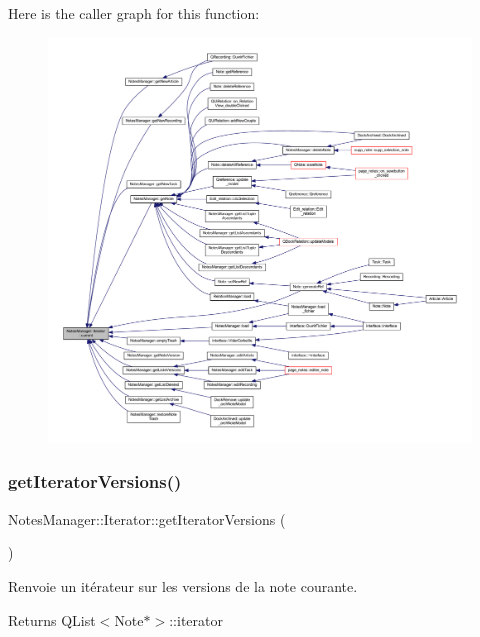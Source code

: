 Here is the caller graph for this function\+:\nopagebreak
\begin{figure}[H]
\begin{center}
\leavevmode
\includegraphics[width=350pt]{class_notes_manager_1_1_iterator_a4fd73444f2edd5f196d7b950527f5a90_icgraph}
\end{center}
\end{figure}
\mbox{\label{class_notes_manager_1_1_iterator_a09a650ca2eeca614a4129ed5e1795e96}} 
\subsubsection{\texorpdfstring{get\+Iterator\+Versions()}{getIteratorVersions()}}
{\footnotesize\ttfamily Notes\+Manager\+::\+Iterator\+::get\+Iterator\+Versions (\begin{DoxyParamCaption}{ }\end{DoxyParamCaption})\hspace{0.3cm}{\ttfamily [inline]}}



Renvoie un itérateur sur les versions de la note courante. 

\begin{DoxyReturn}{Returns}
Q\+List$<$\+Note$\ast$$>$\+::iterator 
\end{DoxyReturn}


